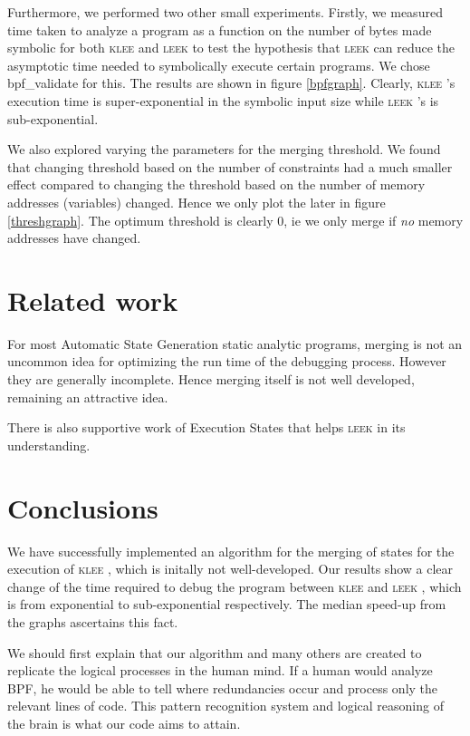 \documentclass[12pt,a4paper]{article}
\newcommand{\klee}{\textsc{klee }}
\newcommand{\leek}{\textsc{leek }}
\begin{document}
Furthermore, we performed two other small experiments. Firstly, we measured time taken to analyze a program as a function on the number of bytes made symbolic for both \klee and \leek to test the hypothesis that \leek can reduce the asymptotic time needed to symbolically execute certain programs. We chose bpf\_validate for this. The results are shown in figure \ref{bpfgraph}. Clearly, \klee's execution time is super-exponential in the symbolic input size while \leek's is sub-exponential.

We also explored varying the parameters for the merging threshold. We found that changing threshold based on the number of constraints had a much smaller effect compared to changing the threshold based on the number of memory addresses (variables) changed. Hence we only plot the later in figure \ref{threshgraph}. The optimum threshold is clearly 0, ie we only merge if \emph{no} memory addresses have changed.

\section{Related work}\label{related}
For most Automatic State Generation static analytic programs, merging is not an uncommon idea for optimizing the run time of the debugging process. However they are generally incomplete\cite{klee}\cite{exe}. Hence merging itself is not well developed, remaining an attractive idea.

There is also supportive work of Execution States\cite{loopsum} that helps \leek in its understanding.

\section{Conclusions}\label{conclusions}
We have successfully implemented an algorithm for the merging of states for the execution of \klee, which is initally not well-developed. Our results show a clear change of the time required to debug the program between \klee and \leek, which is from exponential to sub-exponential respectively. The median speed-up from the graphs ascertains this fact.

We should first explain that our algorithm and many others are created to replicate the logical processes in the human mind. If a human would analyze BPF, he would be able to tell where redundancies occur and process only the relevant lines of code. This pattern recognition system and logical reasoning of the brain is what our code aims to attain.
\end{document}
